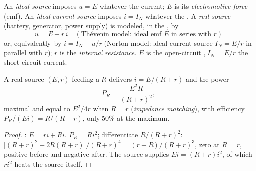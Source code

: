 \begin{definition}\label{def:b1:dc-circuits:sources}
An \emph{ideal  source} imposes $u = E$ whatever the current;
$E$ is its \emph{electromotive force} (emf). An \emph{ideal current
source} imposes $i = I_N$ whatever the . A \emph{real source}
(battery, generator, power supply) is modeled, in the , by
\[
u = E - r\,i \quad (\text{Thévenin model: ideal emf } E \text{ in series with } r)
\]
or, equivalently, by $i = I_N - u/r$ (Norton model: ideal current
source $I_N = E/r$ in parallel with $r$); $r$ is the \emph{internal
resistance}. $E$ is the open-circuit , $I_N = E/r$ the
short-circuit current.
\end{definition}

\begin{proposition}\label{prop:b1:dc-circuits:sourcepower}
A real source $(E, r)$ feeding a  $R$ delivers $i = E/(R + r)$
and the power
\[
P_R = \frac{E^2 R}{(R + r)^2},
\]
maximal and equal to $E^2/4r$ when $R = r$ (\emph{impedance matching}),
with efficiency $P_R/(Ei) = R/(R + r)$, only $50\%$ at the maximum.
\end{proposition}

\begin{proof}
: $E = ri + Ri$. $P_R = Ri^2$; differentiate $R/(R + r)^2$:
$\big[(R + r)^2 - 2R(R + r)\big]/(R + r)^4 = (r - R)/(R + r)^3$, zero at
$R = r$, positive before and negative after. The source supplies
$Ei = (R + r)i^2$, of which $ri^2$ heats the source itself.
\end{proof}

